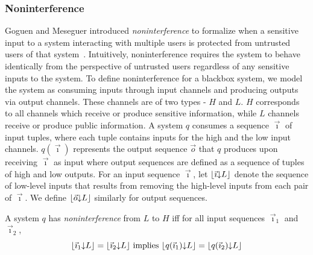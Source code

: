 \documentclass[10pt, onecolumn]{report}
\begin{document}
\subsubsection{Noninterference}
Goguen and Meseguer introduced \emph{noninterference} to formalize when 
a sensitive input to a system interacting with multiple users is protected from untrusted 
users of that system~\cite{gm82security}. 
Intuitively, noninterference requires 
the system to behave identically from the perspective of untrusted users 
regardless of any sensitive inputs to the system.  
To define noninterference for a blackbox system, 
we model the system as consuming inputs through input channels 
and producing outputs via output channels. These channels are of two 
types - $H$ and $L$.
$H$ corresponds to all channels which receive or produce sensitive information, 
while $L$ channels receive or produce public information.
A system $q$ consumes a sequence $\vec{\imath}$ of input tuples,
where each tuple contains inputs for the high and the low input channels. 
$q(\vec{\imath})$ represents the output sequence $\vec{o}$ that $q$ 
produces upon receiving $\vec{\imath}$ as input where output 
sequences are defined as a sequence of tuples of high and low outputs.
For an input sequence $\vec{\imath}$, let 
$\lfloor{\vec{\imath}}{\downarrow}{L}\rfloor$ denote the sequence of low-level inputs 
that results from removing the high-level inputs from each pair of $\vec{\imath}$.
We define $\lfloor{\vec{o}}{\downarrow}{L}\rfloor$ similarly for output sequences.

\begin{definition}[Noninterference]\label{def:noninter}
A system $q$ has \emph{noninterference} from $L$ to $H$ iff for all input sequences $\vec{\imath}_1$ and $\vec{\imath}_2$, 
\[ \lfloor{\vec{\imath}_1}{\downarrow}{L}\rfloor = \lfloor{\vec{\imath}_2}{\downarrow}{L}\rfloor \text{ implies } \lfloor{q(\vec{\imath}_1)}{\downarrow}{L}\rfloor = \lfloor{q(\vec{\imath}_2)}{\downarrow}{L}\rfloor \]
\end{definition}
\end{document}

